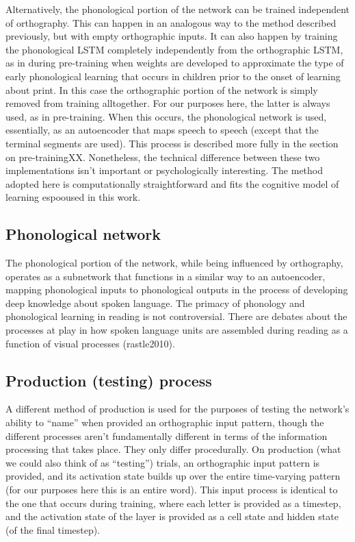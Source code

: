 \documentclass[
  american,
  ,man,floatsintext]{apa6}
\begin{document}
Alternatively, the phonological portion of the network can be trained independent of orthography. This can happen in an analogous way to the method described previously, but with empty orthographic inputs. It can also happen by training the phonological LSTM completely independently from the orthographic LSTM, as in during pre-training when weights are developed to approximate the type of early phonological learning that occurs in children prior to the onset of learning about print. In this case the orthographic portion of the network is simply removed from training alltogether. For our purposes here, the latter is always used, as in pre-training. When this occurs, the phonological network is used, essentially, as an autoencoder that maps speech to speech (except that the terminal segments are used). This process is described more fully in the section on pre-trainingXX. Nonetheless, the technical difference between these two implementations isn't important or psychologically interesting. The method adopted here is computationally straightforward and fits the cognitive model of learning espooused in this work.

\hypertarget{phonological-network}{%
\subsection{Phonological network}\label{phonological-network}}

The phonological portion of the network, while being influenced by orthography, operates as a subnetwork that functions in a similar way to an autoencoder, mapping phonological inputs to phonological outputs in the process of developing deep knowledge about spoken language. The primacy of phonology and phonological learning in reading is not controversial. There are debates about the processes at play in how spoken language units are assembled during reading as a function of visual processes (rastle2010).

\hypertarget{production-testing-process}{%
\subsection{Production (testing) process}\label{production-testing-process}}

A different method of production is used for the purposes of testing the network's ability to ``name'' when provided an orthographic input pattern, though the different processes aren't fundamentally different in terms of the information processing that takes place. They only differ procedurally. On production (what we could also think of as ``testing'') trials, an orthographic input pattern is provided, and its activation state builds up over the entire time-varying pattern (for our purposes here this is an entire word). This input process is identical to the one that occurs during training, where each letter is provided as a timestep, and the activation state of the layer is provided as a cell state and hidden state (of the final timestep).
\end{document}
